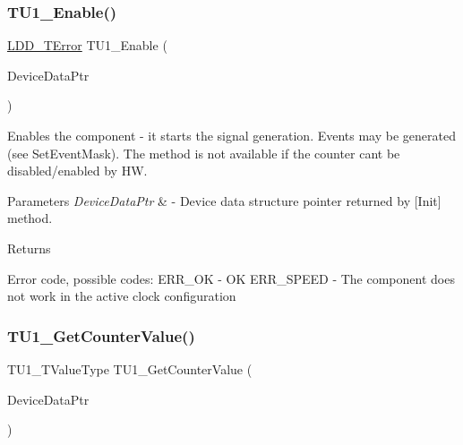 \subsubsection{\texorpdfstring{T\+U1\+\_\+\+Enable()}{TU1\_Enable()}}
{\footnotesize\ttfamily \hyperlink{group___p_e___types__module_ga24c2b045fd04e79e85f261ce4df35588}{L\+D\+D\+\_\+\+T\+Error} T\+U1\+\_\+\+Enable (\begin{DoxyParamCaption}\item[{\hyperlink{group___p_e___types__module_gac5cf1362f1f0e3a2ce71b1bf2276d091}{L\+D\+D\+\_\+\+T\+Device\+Data} $\ast$}]{Device\+Data\+Ptr }\end{DoxyParamCaption})}



Enables the component -\/ it starts the signal generation. Events may be generated (see Set\+Event\+Mask). The method is not available if the counter can\textquotesingle{}t be disabled/enabled by HW. 


\begin{DoxyParams}{Parameters}
{\em Device\+Data\+Ptr} & -\/ Device data structure pointer returned by \mbox{[}Init\mbox{]} method. \\
\hline
\end{DoxyParams}
\begin{DoxyReturn}{Returns}

\begin{DoxyItemize}
\item Error code, possible codes\+: E\+R\+R\+\_\+\+OK -\/ OK E\+R\+R\+\_\+\+S\+P\+E\+ED -\/ The component does not work in the active clock configuration 
\end{DoxyItemize}
\end{DoxyReturn}
\mbox{\label{group___t_u1__module_ga1c2dce8338fb8784787fca8a8162ddbc}} 
\subsubsection{\texorpdfstring{T\+U1\+\_\+\+Get\+Counter\+Value()}{TU1\_GetCounterValue()}}
{\footnotesize\ttfamily T\+U1\+\_\+\+T\+Value\+Type T\+U1\+\_\+\+Get\+Counter\+Value (\begin{DoxyParamCaption}\item[{\hyperlink{group___p_e___types__module_gac5cf1362f1f0e3a2ce71b1bf2276d091}{L\+D\+D\+\_\+\+T\+Device\+Data} $\ast$}]{Device\+Data\+Ptr }\end{DoxyParamCaption})}



